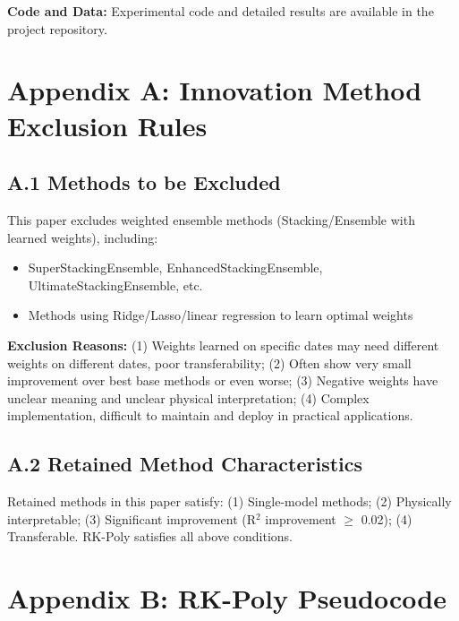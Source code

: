\documentclass[a4paper]{article}
\begin{document}
\textbf{Code and Data:} Experimental code and detailed results are available in the project repository.




\newpage
\section{Appendix A: Innovation Method Exclusion Rules}

\subsection{A.1 Methods to be Excluded}

This paper excludes weighted ensemble methods (Stacking/Ensemble with learned weights), including:

\begin{itemize}
    \item SuperStackingEnsemble, EnhancedStackingEnsemble, UltimateStackingEnsemble, etc.
    \item Methods using Ridge/Lasso/linear regression to learn optimal weights
\end{itemize}

\textbf{Exclusion Reasons:} (1) Weights learned on specific dates may need different weights on different dates, poor transferability; (2) Often show very small improvement over best base methods or even worse; (3) Negative weights have unclear meaning and unclear physical interpretation; (4) Complex implementation, difficult to maintain and deploy in practical applications.

\subsection{A.2 Retained Method Characteristics}

Retained methods in this paper satisfy: (1) Single-model methods; (2) Physically interpretable; (3) Significant improvement (R$^2$ improvement $\ge$ 0.02); (4) Transferable. RK-Poly satisfies all above conditions.

\newpage
\section{Appendix B: RK-Poly Pseudocode}
\end{document}

